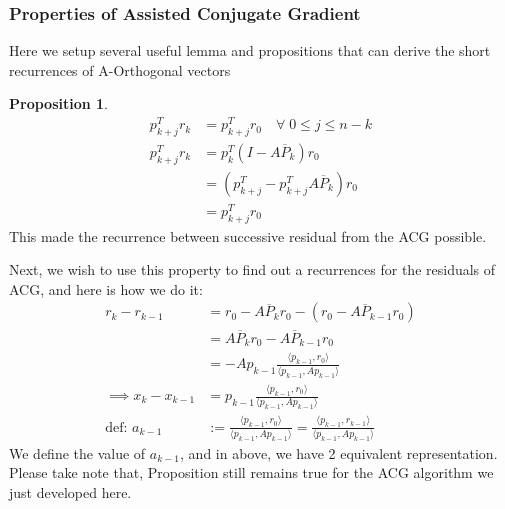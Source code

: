\documentclass[]{article}
\theoremstyle{definition}
\newtheorem{prop}{Proposition}[section]  %
\begin{document}
        \subsubsection{Properties of Assisted Conjugate Gradient}
            Here we setup several useful lemma and propositions that can derive the short recurrences of A-Orthogonal vectors 
            \begin{prop}
                \begin{align}
                    p_{k + j}^Tr_k &= p_{k + j}^Tr_0 \quad \forall \; 0 \le j \le n - k
                    \\
                    p_{k + j}^Tr_k &= p_k^T(I - A\overline{P}_k)r_0
                    \\
                    &= (p^T_{k + j} - p^T_{k + j}A\overline{P}_k)r_0
                    \\
                    &= p_{k + j}^Tr_0    
                \end{align}
                This made the recurrence between successive residual from the ACG possible. 
            \end{prop}
            Next, we wish to use this property to find out a recurrences for the residuals of ACG, and here is how we do it: 
            \begin{align}
                    r_k - r_{k - 1} &= r_0 - A\overline{P}_kr_0 - (r_0 - A\overline{P}_{k - 1}r_0)
                    \\
                    &= A\overline{P}_kr_0 - A\overline{P}_{k - 1}r_0
                    \\
                    &= - Ap_{k - 1}\frac{\langle p_{k - 1}, r_0\rangle}{\langle p_{k - 1}, Ap_{k - 1}\rangle}
                    \\
                    \implies 
                    x_{k} - x_{k - 1} &= 
                    p_{k - 1}\frac{\langle p_{k - 1}, r_0\rangle}{\langle p_{k - 1}, Ap_{k - 1}\rangle}
                    \\
                    \text{def: } a_{k - 1} &:= \frac{\langle p_{k - 1}, r_0\rangle}{
                        \langle p_{k - 1}, Ap_{k - 1}\rangle
                    } = 
                    \frac{\langle p_{k - 1}, r_{k - 1}\rangle}{
                        \langle p_{k - 1}, Ap_{k - 1}\rangle
                    }
            \end{align}
            We define the value of $a_{k - 1}$, and in above, we have 2 equivalent representation. Please take note that, Proposition still remains true for the ACG algorithm we just developed here. 
\end{document}
